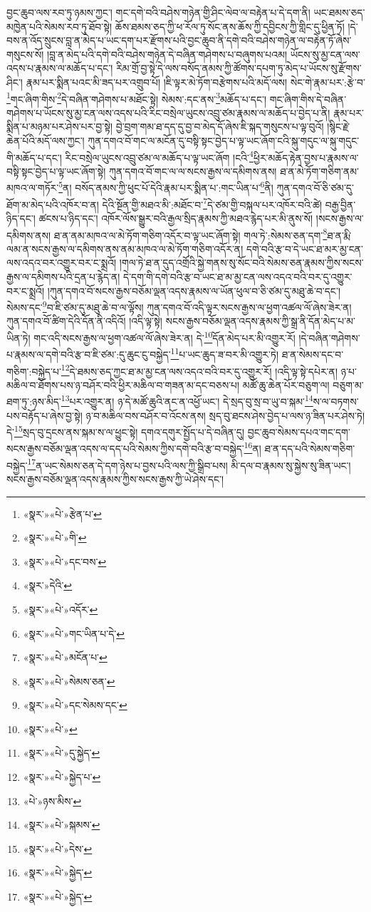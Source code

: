 བྱང་ཆུབ་ལས་རབ་ཏུ་ཉམས་ཀྱང་། གང་དགེ་བའི་བཤེས་གཉེན་གྱི་ཤིང་ལེབ་ལ་བརྟེན་པ་དེ་དག་ནི། ཡང་ཐམས་ཅད་མཁྱེན་པའི་སེམས་རབ་ཏུ་ཐོབ་སྟེ། ཆོས་ཐམས་ཅད་ཀྱི་ཕ་རོལ་ཏུ་སོང་ནས་ཆོས་ཀྱི་དབྱིངས་ཀྱི་གླིང་དུ་ཕྱིན་ཏོ། །དེ་བས་ན་འོད་སྲུངས་བླ་ན་མེད་པ་ཡང་དག་པར་རྫོགས་པའི་བྱང་ཆུབ་ནི་དགེ་བའི་བཤེས་གཉེན་ལ་བརྟེན་ཏོ་ཞེས་གསུངས་སོ། །བླ་ན་མེད་པའི་དགེ་བའི་བཤེས་གཉེན་དེ་བཞིན་གཤེགས་པ་བཞུགས་པའམ། ཡོངས་སུ་མྱ་ངན་ལས་འདས་པ་རྣམས་ལ་མཆོད་པ་དང་། རིམ་གྲོ་བྱ་སྟེ་དེ་ལས་བསོད་ནམས་ཀྱི་ཚོགས་དཔག་ཏུ་མེད་པ་ཡོངས་སུ་རྫོགས་ཤིང་། རྣམ་པར་སྨིན་པའང་མི་ཟད་པར་འགྲུབ་པོ། །ཇི་ལྟར་མེ་ཏོག་བརྩེགས་པའི་མདོ་ལས། སེང་གེ་རྣམ་པར་:རྩེ་བ་\footnote{«སྣར་»«པེ་»རྩེན་པ་}གང་ཞིག་གིས་\footnote{«སྣར་»«པེ་»གི་}དེ་བཞིན་གཤེགས་པ་མཐོང་སྟེ། སེམས་:དང་ནས་\footnote{«སྣར་»«པེ་»དང་བས་}མཆོད་པ་དང་། གང་ཞིག་གིས་དེ་བཞིན་གཤེགས་པ་ཡོངས་སུ་མྱ་ངན་ལས་འདས་པའི་རིང་བསྲེལ་ཡུངས་འབྲུ་ཙམ་རྣམས་ལ་མཆོད་པ་བྱེད་པ་ནི། རྣམ་པར་སྨིན་པ་མཉམ་པར་ཤེས་པར་བྱ་སྟེ། བྱེ་བྲག་གམ་ཐ་དད་དུ་བྱ་བ་མེད་དོ་ཞེས་ཇི་སྐད་གསུངས་པ་ལྟ་བུའོ། །སྙིང་རྗེ་ཆེན་པོའི་མདོ་ལས་ཀྱང་། ཀུན་དགའ་བོ་གང་ལ་མངོན་དུ་བསྟི་སྟང་བྱེད་པ་ལྟ་ཡང་ཞོག་ངའི་སྐུ་གདུང་ལ་སྐུ་གདུང་གི་མཆོད་པ་དང་། རིང་བསྲེལ་ཡུངས་འབྲུ་ཙམ་ལ་མཆོད་པ་ལྟ་ཡང་ཞོག །ངའི་\footnote{«སྣར་»དེའི་}ཕྱིར་མཆོད་རྟེན་བྱས་པ་རྣམས་ལ་བསྟི་སྟང་བྱེད་པ་ལྟ་ཡང་ཞོག་སྟེ། ཀུན་དགའ་བོ་གང་ལ་ལ་སངས་རྒྱས་ལ་དམིགས་ནས། ཐ་ན་མེ་ཏོག་གཅིག་ནམ་མཁའ་ལ་གཏོར་\footnote{«སྣར་»«པེ་»འདོར་}ན། བསོད་ནམས་ཀྱི་ཕུང་པོ་དེའི་རྣམ་པར་སྨིན་པ་:གང་ཡིན་པ་\footnote{«སྣར་»«པེ་»གང་ཡིན་པ་དེ་}ནི། ཀུན་དགའ་བོ་ཅི་ཙམ་དུ་ཐོག་མ་མེད་པའི་འཁོར་བ་ན། དེའི་སྔོན་གྱི་མཐའ་མི་:མཐོང་བ་\footnote{«སྣར་»«པེ་»མངོན་པ་}དེ་ཙམ་གྱི་བསྐལ་པར་འཁོར་བའི་ཚེ། བརྒྱ་བྱིན་ཉིད་དང་། ཚངས་པ་ཉིད་དང་། འཁོར་ལོས་སྒྱུར་བའི་རྒྱལ་སྲིད་རྣམས་ཀྱི་མཐའ་རྙེད་པར་མི་ནུས་སོ། །སངས་རྒྱས་ལ་དམིགས་ནས། ཐ་ན་ནམ་མཁའ་ལ་མེ་ཏོག་གཅིག་འདོར་བ་ལྟ་ཡང་ཞོག་སྟེ། གལ་ཏེ་:སེམས་ཅན་དག་\footnote{«སྣར་»«པེ་»སེམས་ཅན་}ཐ་ན་རྨི་ལམ་ན་སངས་རྒྱས་ལ་དམིགས་ནས་ནམ་མཁའ་ལ་མེ་ཏོག་གཅིག་འདོར་ན། དགེ་བའི་རྩ་བ་དེ་ཡང་ཐ་མར་མྱ་ངན་ལས་འདའ་བར་འགྱུར་བར་ང་སྨྲའོ། །གལ་ཏེ་ཐ་ན་དུད་འགྲོའི་སྐྱེ་གནས་སུ་སོང་བའི་སེམས་ཅན་རྣམས་ཀྱིས་སངས་རྒྱས་ལ་དམིགས་པའི་དྲན་པ་རྙེད་ན། དེ་དག་གི་དགེ་བའི་རྩ་བ་ཡང་ཐ་མ་མྱ་ངན་ལས་འདའ་བའི་བར་དུ་འགྱུར་བར་ང་སྨྲའོ། །ཀུན་དགའ་བོ་སངས་རྒྱས་བཅོམ་ལྡན་འདས་རྣམས་ལ་ཡོན་ཕུལ་བ་ཅི་ཙམ་དུ་མཐུ་ཆེ་བ་དང་། སེམས་དང་\footnote{«སྣར་»«པེ་»དང་སེམས་དང་}བ་ཇི་ཙམ་དུ་མཐུ་ཆེ་བ་ལ་ལྟོས། ཀུན་དགའ་བོ་འདི་ལྟར་སངས་རྒྱས་ལ་ཕྱག་འཚལ་ལོ་ཞེས་ཟེར་ན། ཀུན་དགའ་བོ་ཚིག་དེའི་དོན་ནི་འདིའོ། །འདི་ལྟ་སྟེ། སངས་རྒྱས་བཅོམ་ལྡན་འདས་རྣམས་ཀྱི་སྒྲ་ནི་དོན་མེད་པ་མ་ཡིན་ཏེ། གང་འདི་སངས་རྒྱས་ལ་ཕྱག་འཚལ་ལོ་ཞེས་ཟེར་ན། དེ་\footnote{«སྣར་»«པེ་»}དོན་མེད་པར་མི་འགྱུར་རོ། །དེ་བཞིན་གཤེགས་པ་རྣམས་ལ་དགེ་བའི་རྩ་བ་ཇི་ཙམ་:དུ་ཆུང་ངུ་བསྐྱེད་\footnote{«སྣར་»«པེ་»དུ་སྐྱེད་}པ་ཡང་ཆུད་ཟ་བར་མི་འགྱུར་ཏེ། ཐ་ན་སེམས་དང་བ་གཅིག་:བསྐྱེད་པ་\footnote{«སྣར་»«པེ་»སྐྱེད་པ་}དེ་ཐམས་ཅད་ཀྱང་ཐ་མ་མྱ་ངན་ལས་འདའ་བའི་བར་དུ་འགྱུར་རོ། །འདི་ལྟ་སྟེ་དཔེར་ན། ཉ་པ་མཆིལ་བ་ཐོགས་པས་ཉ་བཤོར་བའི་ཕྱིར་མཆིལ་བ་གཟན་མ་དང་བཅས་པ། མཚོ་ཆུ་ཆེན་པོར་བཅུག་ལ། བཅུག་མ་ཐག་ཏུ་:ཉས་མིད་\footnote{«པེ་»ཉས་མིས་}པར་འགྱུར་ན། ཉ་དེ་མཚོ་ཆུའི་ནང་ན་འཕྱོ་ཡང་། དེ་སྲད་བུ་སྲ་བ་ཡུ་བ་སྐམ་\footnote{«སྣར་»«པེ་»སྐམས་}ས་ལ་བཏགས་པས་བརྟོད་པ་ཞེས་བྱ་སྟེ། ཉ་བ་མཆིལ་བས་བཤོར་བ་འོངས་ནས། སྲད་བུ་ཐངས་ཤེས་བྱེད་པ་ལས་ཉ་ཟིན་པར་ཤེས་ཏེ། དེ་\footnote{«སྣར་»«པེ་»དེས་}སྲད་བུ་དྲངས་ནས་སྐམ་ས་ལ་ཕྱུང་སྟེ། དགའ་དགུར་སྤྱོད་པ་དེ་བཞིན་དུ། བྱང་ཆུབ་སེམས་དཔའ་གང་དག་སངས་རྒྱས་བཅོམ་ལྡན་འདས་ལ་དད་པའི་སེམས་ཀྱིས་དགེ་བའི་རྩ་བ་བསྐྱེད་\footnote{«སྣར་»«པེ་»སྐྱེད་}ན། ཐ་ན་དད་པའི་སེམས་གཅིག་བསྐྱེད་\footnote{«སྣར་»«པེ་»སྐྱེད་}ན་ཡང་སེམས་ཅན་དེ་དག་ཉེས་པ་བྱས་པའི་ལས་ཀྱི་སྒྲིབ་པས། མི་དལ་བ་རྣམས་སུ་སྐྱེས་སུ་ཟིན་ཡང་། སངས་རྒྱས་བཅོམ་ལྡན་འདས་རྣམས་ཀྱིས་སངས་རྒྱས་ཀྱི་ཡེ་ཤེས་དང་། 